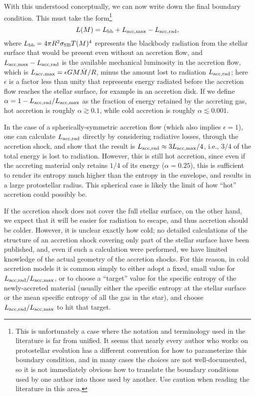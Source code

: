 With this understood conceptually, we can now write down the final boundary condition. This must take the form\footnote{This is unfortunately a case where the notation and terminology used in the literature is far from unified. It seems that nearly every author who works on protostellar evolution has a different convention for how to parameterize this boundary condition, and in many cases the choices are not well-documented, so it is not immediately obvious how to translate the boundary conditions used by one author into those used by another. Use caution when reading the literature in this area.}
\begin{equation}
\label{lbound1}
L(M) = L_{\rm bb} + L_{\rm acc,max} - L_{\rm acc,rad},
\end{equation}
where $L_{\rm bb} = 4\pi R^2 \sigma_{\rm SB} T(M)^4$ represents the blackbody radiation from the stellar surface that would be present even without an accretion flow, and $L_{\rm acc,max} - L_{\rm acc,rad}$ is the available mechanical luminosity in the accretion flow, which is $L_{\rm acc,max}=\epsilon G M \dot{M}/R$, minus the amount lost to radiation $L_{\rm acc,rad}$; here $\epsilon$ is a factor less than unity that represents energy radiated before the accretion flow reaches the stellar surface, for example in an accretion disk. If we define $\alpha = 1 - L_{\rm acc,rad}/L_{\rm acc,max}$ as the fraction of energy retained by the accreting gas, hot accretion is roughly $\alpha \gtrsim 0.1$, while cold accretion is roughly $\alpha \lesssim 0.001$.

In the case of a spherically-symmetric accretion flow (which also implies $\epsilon=1$), one can calculate $L_{\rm acc,rad}$ directly by considering radiative losses, through the accretion shock, and \citet{stahler80a, stahler80b, stahler81a} show that the result is $L_{\rm acc,rad}\approx 3 L_{\rm acc,max}/4$, i.e., $3/4$ of the total energy is lost to radiation. However, this is still hot accretion, since even if the accreting material only retains $1/4$ of its energy ($\alpha=0.25$), this is sufficient to render its entropy much higher than the entropy in the envelope, and results in a large protostellar radius. This spherical case is likely the limit of how ``hot'' accretion could possibly be.

If the accretion shock does not cover the full stellar surface, on the other hand, we expect that it will be easier for radiation to escape, and thus accretion should be colder. However, it is unclear exactly how cold; no detailed calculations of the structure of an accretion shock covering only part of the stellar surface have been published, and, even if such a calculation were performed, we have limited knowledge of the actual geometry of the accretion shocks. For this reason, in cold accretion models it is common simply to either adopt a fixed, small value for $L_{\rm acc,rad}/L_{\rm acc,max}$, or to choose a ``target'' value for the specific entropy of the newly-accreted material (usually either the specific entropy at the stellar surface or the mean specific entropy of all the gas in the star), and choose $L_{\rm acc,rad}/L_{\rm acc,max}$ to hit that target. 

